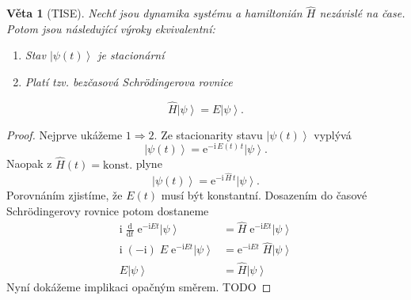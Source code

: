 \documentclass[10pt,a4paper]{article}
\newtheorem{theorem}{Věta}[section]
\theoremstyle{definition}
\newcommand{\const}[1]{\mathrm{#1}}
\newcommand{\dd}[2]{\frac{\const{d} #1}{\const{d} #2} \;}
\newcommand{\ket}[1]{\left| #1 \right>}
\newcommand{\e}[1]{\const{e}^{#1}}
\renewcommand{\i}{\const{i}}
\def\konst{\mathrm{konst.}}
\begin{document}
\begin{theorem}[TISE]
    Nechť jsou dynamika systému a hamiltonián $\hat H$ nezávislé na čase. Potom jsou následující výroky ekvivalentní:
    \begin{enumerate}
        \item Stav $\ket{\psi(t)}$ je stacionární
        \item Platí tzv. bezčasová Schrödingerova rovnice
    \end{enumerate}
    \begin{equation*}
        \hat{H} \ket{\psi} = E \ket{\psi}.
    \end{equation*}
\end{theorem}
\begin{proof}
    Nejprve ukážeme $1 \Rightarrow 2$. Ze stacionarity stavu $\ket{\psi(t)}$ vyplývá
    \begin{equation*}
        \ket{\psi(t)} = \e{-\i \, E(t) \, t} \ket{\psi}.
    \end{equation*}
    Naopak z $\hat H(t) = \konst$ plyne
    \begin{equation*}
        \ket{\psi(t)} = \e{-\i \, \hat H \, t} \ket{\psi}.
    \end{equation*}
    Porovnáním zjistíme, že $E(t)$ musí být konstantní. Dosazením do časové Schrödingerovy rovnice potom dostaneme
    \begin{align*}
        \i \; \dd{}{t} \! \e{-\i E t} \ket{\psi}
        &= \hat H \; \e{-\i E t} \ket{\psi}
        \\
        \i \; (-\i) \; E \; \e{-\i E t} \ket{\psi}
        &= \e{-\i E t} \; \hat H \ket{\psi}
        \\
        E \ket{\psi}
        &= \hat H \ket{\psi}
    \end{align*}
    Nyní dokážeme implikaci opačným směrem. TODO
\end{proof}
\end{document}
